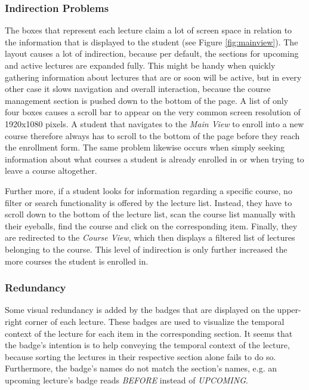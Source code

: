 \subsubsection{Indirection Problems}

The boxes that represent each lecture claim a lot of screen space in relation to the information that is displayed to the student (see Figure \ref{fig:mainview}). The layout causes a lot of indirection, because per default, the sections for upcoming and active lectures are expanded fully. This might be handy when quickly gathering information about lectures that are or soon will be active, but in every other case it slows navigation and overall interaction, because the course management section is pushed down to the bottom of the page.
A list of only four boxes causes a scroll bar to appear on the very common screen resolution of 1920x1080 pixels. A student that navigates to the \emph{Main View} to enroll into a new course therefore always has to scroll to the bottom of the page before they reach the enrollment form. The same problem likewise occurs when simply seeking information about what courses a student is already enrolled in or when trying to leave a course altogether. 

Further more, if a student looks for information regarding a specific course, no filter or search functionality is offered by the lecture list. Instead, they have to scroll down to the bottom of the lecture list, scan the course list manually with their eyeballs, find the course and click on the corresponding item. Finally, they are redirected to the \emph{Course View}, which then displays a filtered list of lectures belonging to the course. This level of indirection is only further increased the more courses the student is enrolled in. 


\subsubsection{Redundancy}

Some visual redundancy is added by the badges that are displayed on the upper-right corner of each lecture. These badges are used to visualize the temporal context of the lecture for each item in the corresponding section. It seems that the badge's intention is to help conveying the temporal context of the lecture, because sorting the lectures in their respective section alone fails to do so. Furthermore, the badge's names do not match the section's names, e.g. an upcoming lecture's badge reads \emph{BEFORE} instead of \emph{UPCOMING}. 

